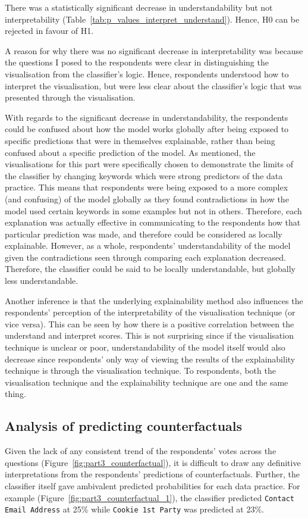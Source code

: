 There was a statistically significant decrease in understandability but not interpretability (Table~\ref{tab:p_values_interpret_understand}). Hence, H0 can be rejected in favour of H1. 

A reason for why there was no significant decrease in interpretability was because the questions I posed to the respondents were clear in distinguishing the visualisation from the classifier's logic. Hence, respondents understood how to interpret the visualisation, but were less clear about the classifier's logic that was presented through the visualisation. 

With regards to the significant decrease in understandability, the respondents could be confused about how the model works globally after being exposed to specific predictions that were in themselves explainable, rather than being confused about a specific prediction of the model. As mentioned, the visualisations for this part were specifically chosen to demonstrate the limits of the classifier by changing keywords which were strong predictors of the data practice. This means that respondents were being exposed to a more complex (and confusing) of the model globally as they found contradictions in how the model used certain keywords in some examples but not in others. Therefore, each explanation was actually effective in communicating to the respondents how that particular prediction was made, and therefore could be considered as locally explainable. However, as a whole, respondents' understandability of the model given the contradictions seen through comparing each explanation decreased. Therefore, the classifier could be said to be locally understandable, but globally less understandable.

Another inference is that the underlying explainability method also influences the respondents' perception of the interpretability of the visualisation technique (or vice versa). This can be seen by how there is a positive correlation between the understand and interpret scores. This is not surprising since if the visualisation technique is unclear or poor, understandability of the model itself would also decrease since respondents' only way of viewing the results of the explainability technique is through the visualisation technique. To respondents, both the visualisation technique and the explainability technique are one and the same thing.

\subsection{Analysis of predicting counterfactuals}
Given the lack of any consistent trend of the respondents' votes across the questions (Figure~\ref{fig:part3_counterfactual}), it is difficult to draw any definitive interpretations from the respondents' predictions of counterfactuals. Further, the classifier itself gave ambivalent predicted probabilities for each data practice. For example (Figure~\ref{fig:part3_counterfactual_1}), the classifier predicted \texttt{Contact Email Address} at 25\% while \texttt{Cookie 1st Party} was predicted at 23\%.

